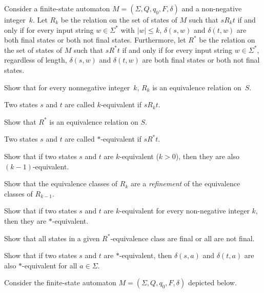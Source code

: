 \documentclass[a4paper,12pt]{article}
\begin{document}
\begin{tasks}
    \item Consider a finite-state automaton $M = (\Sigma, Q, q_0, F, \delta)$ and a non-negative integer~$k$.
    Let $R_k$ be the relation on the set of states of $M$ such that $s \mathrel{R_k} t$ if and only if for every input string $w \in \Sigma^*$ with $|w| \leq k$, $\delta(s, w)$ and $\delta(t, w)$ are both final states or both not final states.
    Furthermore, let $R^*$ be the relation on the set of states of $M$ such that $s \mathrel{R^*} t$ if and only if for every input string $w \in \Sigma^*$, regardless of length, $\delta(s, w)$ and $\delta(t, w)$ are both final states or both not final states.

    \begin{subtasks}
        \item Show that for every nonnegative integer~$k$, $R_k$ is an equivalence relation on~$S$.
        \par Two states $s$ and $t$ are called $k$-equivalent if $s \mathrel{R_k} t$.

        \item Show that $R^*$ is an equivalence relation on $S$.
        \par Two states $s$ and $t$ are called $*$-equivalent if $s \mathrel{R^*} t$.

        \item Show that if two states $s$ and $t$ are $k$-equivalent ($k > 0$), then they are also $(k - 1)$-equivalent.

        \item Show that the equivalence classes of $R_k$ are a \emph{refinement} of the equivalence classes of $R_{k-1}$.

        \item Show that if two states $s$ and $t$ are $k$-equivalent for every non-negative integer $k$, then they are $*$-equivalent.

        \item Show that all states in a given $R^*$-equivalence class are final or all are not final.

        \item Show that if two states $s$ and $t$ are $*$-equivalent, then $\delta(s, a)$ and $\delta(t, a)$ are also $*$-equivalent for all $a \in \Sigma$.
    \end{subtasks}


    \item Consider the finite-state automaton $M = (\Sigma, Q, q_0, F, \delta)$ depicted below.


\end{tasks}
\end{document}
